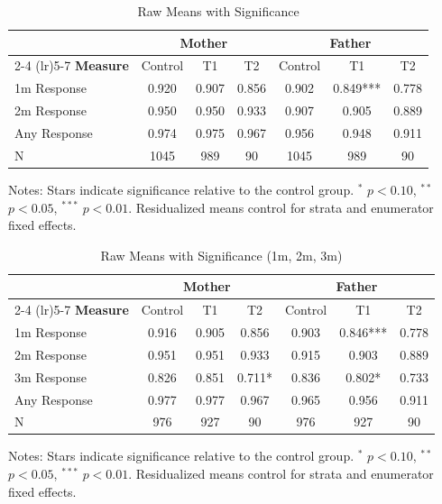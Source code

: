 \begin{table}[htbp]
\centering
\caption{Raw Means with Significance}
\begin{tabular}{lcccccc}
\toprule
& \multicolumn{3}{c}{\textbf{Mother}} & \multicolumn{3}{c}{\textbf{Father}} \\
\cmidrule(lr){2-4} \cmidrule(lr){5-7}
\textbf{Measure} & Control & T1 & T2 & Control & T1 & T2 \\
\midrule
1m Response &  0.920 &  0.907 &  0.856 &  0.902 &  0.849*** &  0.778 \\
2m Response &  0.950 &  0.950 &  0.933 &  0.907 &  0.905 &  0.889 \\
Any Response &  0.974 &  0.975 &  0.967 &  0.956 &  0.948 &  0.911 \\
N & 1045 & 989 & 90 & 1045 & 989 & 90 \\
\bottomrule
\end{tabular}
\begin{tablenotes}
\small
Notes: Stars indicate significance relative to the control group. 
$^{*}$ $p<0.10$, $^{**}$ $p<0.05$, $^{***}$ $p<0.01$.
Residualized means control for strata and enumerator fixed effects.
\end{tablenotes}
\end{table}
\begin{table}[htbp]
\centering
\caption{Raw Means with Significance (1m, 2m, 3m)}
\begin{tabular}{lcccccc}
\toprule
& \multicolumn{3}{c}{\textbf{Mother}} & \multicolumn{3}{c}{\textbf{Father}} \\
\cmidrule(lr){2-4} \cmidrule(lr){5-7}
\textbf{Measure} & Control & T1 & T2 & Control & T1 & T2 \\
\midrule
1m Response &  0.916 &  0.905 &  0.856 &  0.903 &  0.846*** &  0.778 \\
2m Response &  0.951 &  0.951 &  0.933 &  0.915 &  0.903 &  0.889 \\
3m Response &  0.826 &  0.851 &  0.711* &  0.836 &  0.802* &  0.733 \\
Any Response &  0.977 &  0.977 &  0.967 &  0.965 &  0.956 &  0.911 \\
N & 976 & 927 & 90 & 976 & 927 & 90 \\
\bottomrule
\end{tabular}
\begin{tablenotes}
\small
Notes: Stars indicate significance relative to the control group. 
$^{*}$ $p<0.10$, $^{**}$ $p<0.05$, $^{***}$ $p<0.01$.
Residualized means control for strata and enumerator fixed effects.
\end{tablenotes}
\end{table}
